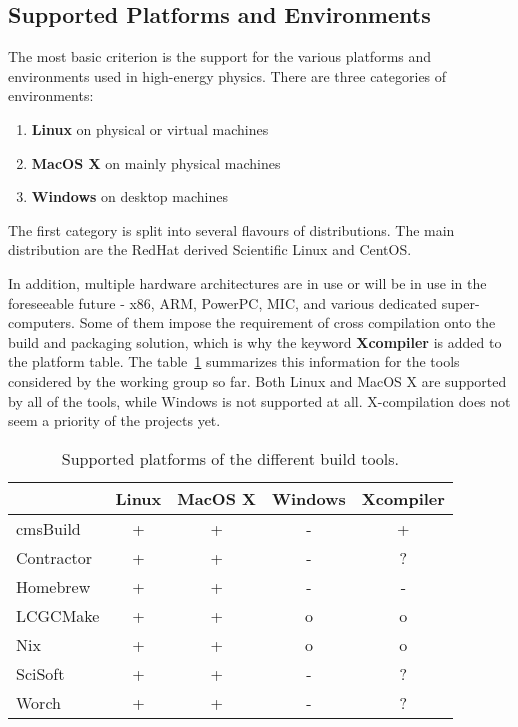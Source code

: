 \documentclass[12pt,a4paper]{article}
\begin{document}
\subsection{Supported Platforms and Environments}
The most basic criterion is the support for the various platforms and environments used in high-energy physics. There are three categories of environments:
\begin{enumerate}
\item \textbf{Linux} on physical or virtual machines
\item \textbf{MacOS X} on mainly physical machines
\item \textbf{Windows} on desktop machines
\end{enumerate}
The first category is split into several flavours of distributions. The main distribution are the RedHat derived Scientific Linux\cite{sl} and CentOS\cite{centos}. 

In addition, multiple hardware architectures are in use or will be in use in the foreseeable future - x86, ARM, PowerPC, MIC, and various dedicated super-computers. Some of them impose the requirement of cross compilation onto the build and packaging solution, which is why the keyword \textbf{Xcompiler} is added to the platform table.
The table~\ref{tab:taxonomyPlatforms} summarizes this information for the tools considered by the working group so far. Both Linux and MacOS X are supported by all of the tools, while Windows is not supported at all. X-compilation does not seem a priority of the projects yet.

\begin{table}
\centering
\begin{tabular}{lcccc}
& Linux & MacOS X & Windows & Xcompiler \\ \hline
cmsBuild & \cellcolor{green} + & \cellcolor{green} + & \cellcolor{red} - & \cellcolor{green} +  \\
Contractor & \cellcolor{green} + & \cellcolor{green} + & \cellcolor{red} - & ?\\
Homebrew & \cellcolor{green} + & \cellcolor{green} + & \cellcolor{red} - & \cellcolor{red} -\\
LCGCMake & \cellcolor{green} + & \cellcolor{green} + & \cellcolor{yellow} o   & \cellcolor{yellow} o \\
Nix & \cellcolor{green} + & \cellcolor{green} + & \cellcolor{yellow} o  & \cellcolor{yellow} o \\
SciSoft &  \cellcolor{green} + & \cellcolor{green} + & \cellcolor{red} - & ? \\
Worch &  \cellcolor{green} + &  \cellcolor{green}  + & \cellcolor{red} -  & ?
\end{tabular}
\caption{\label{tab:taxonomyPlatforms}Supported platforms of the different build tools.}
\end{table}
\end{document}
